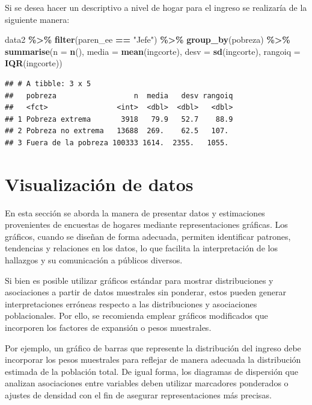 \documentclass[
  spanish,
  12pt,
]{book}
\newenvironment{Shaded}{\begin{snugshade}}{\end{snugshade}}
\newcommand{\AttributeTok}[1]{\textcolor[rgb]{0.13,0.29,0.53}{#1}}
\newcommand{\FunctionTok}[1]{\textcolor[rgb]{0.13,0.29,0.53}{\textbf{#1}}}
\newcommand{\NormalTok}[1]{#1}
\newcommand{\SpecialCharTok}[1]{\textcolor[rgb]{0.81,0.36,0.00}{\textbf{#1}}}
\newcommand{\StringTok}[1]{\textcolor[rgb]{0.31,0.60,0.02}{#1}}
\begin{document}
Si se desea hacer un descriptivo a nivel de hogar para el ingreso se realizaría de la siguiente manera:

\begin{Shaded}
\begin{Highlighting}[]
\NormalTok{data2 }\SpecialCharTok{\%\textgreater{}\%} \FunctionTok{filter}\NormalTok{(paren\_ee }\SpecialCharTok{==} \StringTok{"Jefe"}\NormalTok{) }\SpecialCharTok{\%\textgreater{}\%} 
  \FunctionTok{group\_by}\NormalTok{(pobreza) }\SpecialCharTok{\%\textgreater{}\%}
  \FunctionTok{summarise}\NormalTok{(}\AttributeTok{n =} \FunctionTok{n}\NormalTok{(),}
            \AttributeTok{media =} \FunctionTok{mean}\NormalTok{(ingcorte),}
            \AttributeTok{desv =} \FunctionTok{sd}\NormalTok{(ingcorte),}
            \AttributeTok{rangoiq =} \FunctionTok{IQR}\NormalTok{(ingcorte))}
\end{Highlighting}
\end{Shaded}

\begin{verbatim}
## # A tibble: 3 x 5
##   pobreza                  n  media   desv rangoiq
##   <fct>                <int>  <dbl>  <dbl>   <dbl>
## 1 Pobreza extrema       3918   79.9   52.7    88.9
## 2 Pobreza no extrema   13688  269.    62.5   107. 
## 3 Fuera de la pobreza 100333 1614.  2355.   1055.
\end{verbatim}

\chapter{Visualización de datos}\label{visualizaciuxf3n-de-datos}

En esta sección se aborda la manera de presentar datos y estimaciones provenientes de encuestas de hogares mediante representaciones gráficas. Los gráficos, cuando se diseñan de forma adecuada, permiten identificar patrones, tendencias y relaciones en los datos, lo que facilita la interpretación de los hallazgos y su comunicación a públicos diversos.

Si bien es posible utilizar gráficos estándar para mostrar distribuciones y asociaciones a partir de datos muestrales sin ponderar, estos pueden generar interpretaciones erróneas respecto a las distribuciones y asociaciones poblacionales. Por ello, se recomienda emplear gráficos modificados que incorporen los factores de expansión o pesos muestrales.

Por ejemplo, un gráfico de barras que represente la distribución del ingreso debe incorporar los pesos muestrales para reflejar de manera adecuada la distribución estimada de la población total. De igual forma, los diagramas de dispersión que analizan asociaciones entre variables deben utilizar marcadores ponderados o ajustes de densidad con el fin de asegurar representaciones más precisas.
\end{document}
